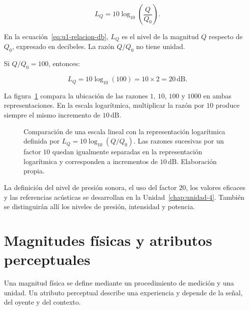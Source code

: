 \begin{equation}
    L_Q=10\log_{10}\left(\frac{Q}{Q_0}\right).
    \label{eq:u1-relacion-db}
\end{equation}

En la ecuación~\eqref{eq:u1-relacion-db}, \(L_Q\) es el nivel de la magnitud \(Q\) respecto de \(Q_0\), expresado en decibeles. La razón \(Q/Q_0\) no tiene unidad.

Si \(Q/Q_0=100\), entonces:

\[
    L_Q=10\log_{10}(100)
       =10\times2
       =20\,\text{dB}.
\]

La figura~\ref{fig:escala-lineal-logaritmica} compara la ubicación de las razones \(1\), \(10\), \(100\) y \(1000\) en ambas representaciones. En la escala logarítmica, multiplicar la razón por \(10\) produce siempre el mismo incremento de \(10\,\text{dB}\).

\begin{figure}[htbp]
    \centering
    
    \caption{Comparación de una escala lineal con la representación logarítmica definida por \(L_Q=10\log_{10}(Q/Q_0)\). Las razones sucesivas por un factor \(10\) quedan igualmente separadas en la representación logarítmica y corresponden a incrementos de \(10\,\text{dB}\). Elaboración propia.}
    \label{fig:escala-lineal-logaritmica}
\end{figure}

La definición del nivel de presión sonora, el uso del factor \(20\), los valores eficaces y las referencias acústicas se desarrollan en la Unidad~\ref{chap:unidad-4}. También se distinguirán allí los niveles de presión, intensidad y potencia.

\section{Magnitudes físicas y atributos perceptuales}
\label{sec:u1-fisico-perceptual}

Una magnitud física se define mediante un procedimiento de medición y una unidad. Un atributo perceptual describe una experiencia y depende de la señal, del oyente y del contexto.

